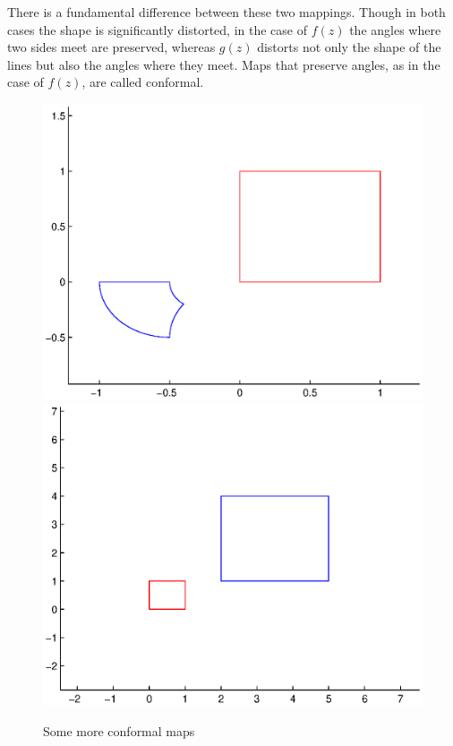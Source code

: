 There is a fundamental difference between these two mappings.  Though in both cases the shape is significantly distorted, in the case of $f(z)$ the angles where two sides meet are preserved, whereas $g(z)$ distorts not only the shape of the lines but also the angles where they meet.  Maps that preserve angles, as in the case of $f(z)$, are called conformal.

\begin{figure}
\begin{center}
\includegraphics[scale=0.33]{map3}
\includegraphics[scale=0.33]{map4}
\caption{Some more conformal maps}
\end{center}
\end{figure}


